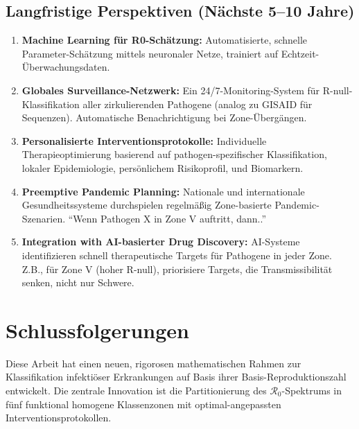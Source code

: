 ﻿\documentclass[a4paper,12pt,twoside]{article}
\theoremstyle{definition}
\begin{document}
\subsection{Langfristige Perspektiven (Nächste 5--10 Jahre)}

\begin{enumerate}

\item \textbf{Machine Learning für R0-Schätzung:} Automatisierte, schnelle Parameter-Schätzung mittels neuronaler Netze, trainiert auf Echtzeit-Überwachungsdaten.

\item \textbf{Globales Surveillance-Netzwerk:} Ein 24/7-Monitoring-System für R-null-Klassifikation aller zirkulierenden Pathogene (analog zu GISAID für Sequenzen). Automatische Benachrichtigung bei Zone-Übergängen.

\item \textbf{Personalisierte Interventionsprotokolle:} Individuelle Therapieoptimierung basierend auf pathogen-spezifischer Klassifikation, lokaler Epidemiologie, persönlichem Risikoprofil, und Biomarkern.

\item \textbf{Preemptive Pandemic Planning:} Nationale und internationale Gesundheitssysteme durchspielen regelmäßig Zone-basierte Pandemic-Szenarien. ``Wenn Pathogen X in Zone V auftritt, dann..''

\item \textbf{Integration with AI-basierter Drug Discovery:} AI-Systeme identifizieren schnell therapeutische Targets für Pathogene in jeder Zone. Z.B., für Zone V (hoher R-null), priorisiere Targets, die Transmissibilität senken, nicht nur Schwere.

\end{enumerate}

\section{Schlussfolgerungen}
\label{sec:conclusion}

Diese Arbeit hat einen neuen, rigorosen mathematischen Rahmen zur Klassifikation infektiöser Erkrankungen auf Basis ihrer Basis-Reproduktionszahl entwickelt. Die zentrale Innovation ist die Partitionierung des $\mathcal{R}_0$-Spektrums in fünf funktional homogene Klassenzonen mit optimal-angepassten Interventionsprotokollen.
\end{document}
